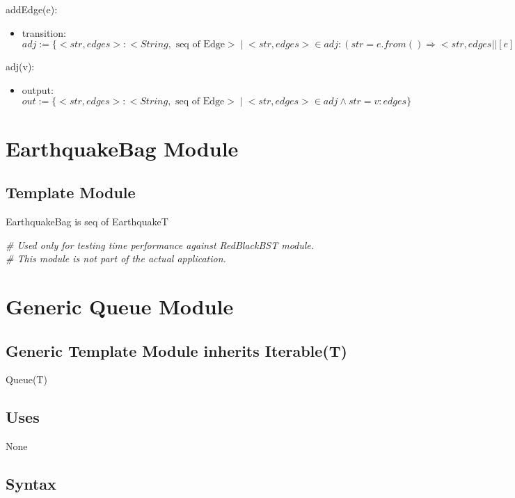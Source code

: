 \documentclass[12pt]{article}
\begin{document}
\noindent addEdge(e):
\begin{itemize}
\item transition: $adj := \{<str, edges>: <String, \mbox{ seq of Edge}> \;|\; <str, edges> \in adj : (str = e.from() \Rightarrow <str, edges || [e]> \;|\; true \Rightarrow <str, edges>)\}$ 

\end{itemize}

\noindent adj(v):
\begin{itemize}
\item output: $\mathit{out} := \{<str, edges>: <String, \mbox{ seq of Edge}> \;|\; <str, edges> \in adj \land str = v: edges\}$
\end{itemize}


\newpage

\section* {EarthquakeBag Module}

\subsection*{Template Module}

EarthquakeBag is seq of EarthquakeT

\medskip

\noindent \textit{\# Used only for testing time performance against RedBlackBST module.}\\
\noindent \textit{\# This module is not part of the actual application.}

\newpage

\section* {Generic Queue Module}

\subsection*{Generic Template Module inherits Iterable(T)}

Queue(T)

\subsection* {Uses}

None

\subsection* {Syntax}
\end{document}
